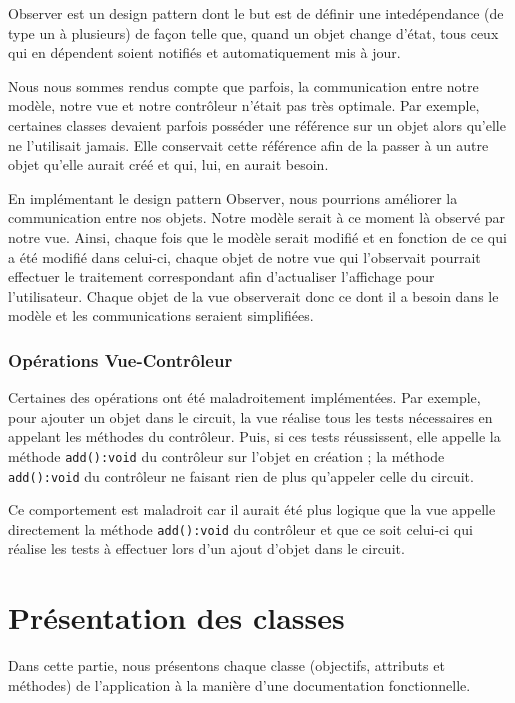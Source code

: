 \documentclass{report}
\begin{document}
Observer est un design pattern dont le but est de définir une intedépendance (de type un à plusieurs) de façon telle que, quand un objet change d'état, tous ceux qui en dépendent soient notifiés et automatiquement mis à jour.

Nous nous sommes rendus compte que parfois, la communication entre notre modèle, notre vue et notre contrôleur n'était pas très optimale. Par exemple, certaines classes devaient parfois posséder une référence sur un objet alors qu'elle ne l'utilisait jamais. Elle conservait cette référence afin de la passer à un autre objet qu'elle aurait créé et qui, lui, en aurait besoin.

En implémentant le design pattern Observer, nous pourrions améliorer la communication entre nos objets. Notre modèle serait à ce moment là observé par notre vue. Ainsi, chaque fois que le modèle serait modifié et en fonction de ce qui a été modifié dans celui-ci, chaque objet de notre vue qui l'observait pourrait effectuer le traitement correspondant afin d'actualiser l'affichage pour l'utilisateur. Chaque objet de la vue observerait donc ce dont il a besoin dans le modèle et les communications seraient simplifiées.

\subsubsection{Opérations Vue-Contrôleur}

Certaines des opérations ont été maladroitement implémentées. Par exemple, pour ajouter un objet dans le circuit, la vue réalise tous les tests nécessaires en appelant les méthodes du contrôleur. Puis, si ces tests réussissent, elle appelle la méthode \texttt{add():void} du contrôleur sur l'objet en création ; la méthode \texttt{add():void} du contrôleur ne faisant rien de plus qu'appeler celle du circuit.

Ce comportement est maladroit car il aurait été plus logique que la vue appelle directement la méthode \texttt{add():void} du contrôleur et que ce soit celui-ci qui réalise les tests à effectuer lors d'un ajout d'objet dans le circuit.

\section{Présentation des classes}

Dans cette partie, nous présentons chaque classe (objectifs, attributs et méthodes) de l'application à la manière d'une documentation fonctionnelle.
\end{document}
